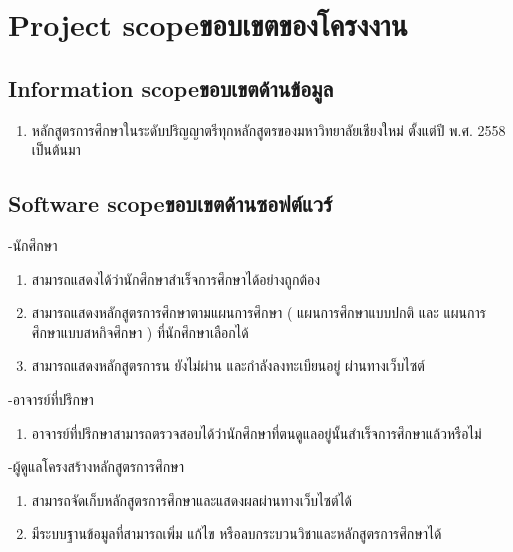 \section{\ifenglish Project scope\else ขอบเขตของโครงงาน\fi}

\subsection{\ifenglish Information scope\else ขอบเขตด้านข้อมูล\fi}
\begin{enumerate}
    \item หลักสูตรการศึกษาในระดับปริญญาตรีทุกหลักสูตรของมหาวิทยาลัยเชียงใหม่ ตั้งแต่ปี พ.ศ. 2558 เป็นต้นมา 
\end{enumerate}


\subsection{\ifenglish Software scope\else ขอบเขตด้านซอฟต์แวร์\fi}

-นักศึกษา 

\begin{enumerate}
    \item สามารถแสดงได้ว่านักศึกษาสำเร็จการศึกษาได้อย่างถูกต้อง
    \item สามารถแสดงหลักสูตรการศึกษาตามแผนการศึกษา ( แผนการศึกษาแบบปกติ และ แผนการศึกษาแบบสหกิจศึกษา ) ที่นักศึกษาเลือกได้
    \item สามารถแสดงหลักสูตรการน ยังไม่ผ่าน และกำลังลงทะเบียนอยู่ ผ่านทางเว็บไซต์
\end{enumerate}

-อาจารย์ที่ปรึกษา 

\begin{enumerate}
    \item อาจารย์ที่ปรึกษาสามารถตรวจสอบได้ว่านักศึกษาที่ตนดูแลอยู่นั้นสำเร็จการศึกษาแล้วหรือไม่
\end{enumerate}

-ผู้ดูแลโครงสร้างหลักสูตรการศึกษา

\begin{enumerate}
    \item สามารถจัดเก็บหลักสูตรการศึกษาและแสดงผลผ่านทางเว็บไซต์ได้
    \item มีระบบฐานข้อมูลที่สามารถเพิ่ม แก้ไข หรือลบกระบวนวิชาและหลักสูตรการศึกษาได้
\end{enumerate}

